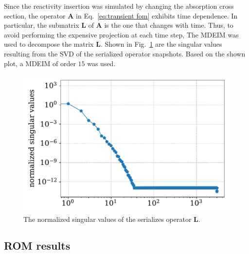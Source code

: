 \documentclass[]{interact}
\theoremstyle{plain}%
\theoremstyle{definition}
\theoremstyle{remark}
\begin{document}
Since the reactivity insertion was simulated by changing the absorption cross section, the operator $\mathbf{A}$ in Eq.~\ref{eq:transient fom} exhibits time dependence.
In particular, the submatrix $\mathbf{L}$ of $\mathbf{A}$ is the one that changes with time.
Thus, to avoid performing the expensive projection at each time step, 
The MDEIM was used to decompose the matrix $\mathbf{L}$.
Shown in Fig.~\ref{fig:lra L singular values} are the singular values resulting from the SVD of the serialized operator snapshots. 
Based on the shown plot, a MDEIM of order $15$ was used.

\begin{figure}[H]
	\includegraphics[width=1.0\linewidth]{../figures/LRA_L_singular_values.pdf}
	\caption{The normalized singular values of the serializes operator $\mathbf{L}$.}
	\label{fig:lra L singular values}
\end{figure}

\subsection{ROM results}
\end{document}
